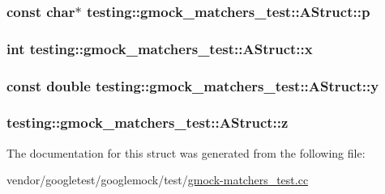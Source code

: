 \subsubsection[{\texorpdfstring{p}{p}}]{\setlength{\rightskip}{0pt plus 5cm}const char$\ast$ testing\+::gmock\+\_\+matchers\+\_\+test\+::\+A\+Struct\+::p}\hypertarget{structtesting_1_1gmock__matchers__test_1_1AStruct_a65755db7d763d53c13483bb520f1efcd}{}\label{structtesting_1_1gmock__matchers__test_1_1AStruct_a65755db7d763d53c13483bb520f1efcd}
\subsubsection[{\texorpdfstring{x}{x}}]{\setlength{\rightskip}{0pt plus 5cm}int testing\+::gmock\+\_\+matchers\+\_\+test\+::\+A\+Struct\+::x}\hypertarget{structtesting_1_1gmock__matchers__test_1_1AStruct_a539eea02599ad34ff2bf90cc2c1adf26}{}\label{structtesting_1_1gmock__matchers__test_1_1AStruct_a539eea02599ad34ff2bf90cc2c1adf26}
\subsubsection[{\texorpdfstring{y}{y}}]{\setlength{\rightskip}{0pt plus 5cm}const double testing\+::gmock\+\_\+matchers\+\_\+test\+::\+A\+Struct\+::y}\hypertarget{structtesting_1_1gmock__matchers__test_1_1AStruct_a08b8592764aa4775c3d5a3542470f8bb}{}\label{structtesting_1_1gmock__matchers__test_1_1AStruct_a08b8592764aa4775c3d5a3542470f8bb}
\subsubsection[{\texorpdfstring{z}{z}}]{ testing\+::gmock\+\_\+matchers\+\_\+test\+::\+A\+Struct\+::z}\hypertarget{structtesting_1_1gmock__matchers__test_1_1AStruct_a45b1006e4a7b21037610a385dcae6d8c}{}\label{structtesting_1_1gmock__matchers__test_1_1AStruct_a45b1006e4a7b21037610a385dcae6d8c}


The documentation for this struct was generated from the following file\+:\begin{DoxyCompactItemize}
\item 
vendor/googletest/googlemock/test/\hyperlink{gmock-matchers__test_8cc}{gmock-\/matchers\+\_\+test.\+cc}\end{DoxyCompactItemize}
